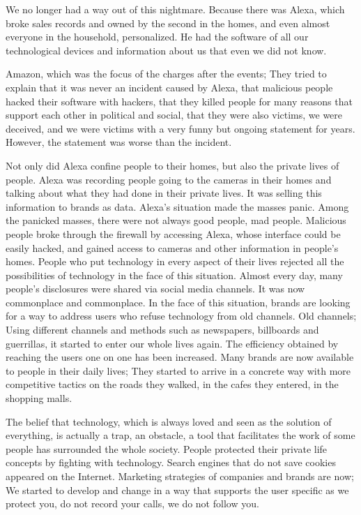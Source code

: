 \documentclass[]{book}
\begin{document}
We no longer had a way out of this nightmare. Because there was Alexa, which broke sales records and owned by the second in the homes, and even almost everyone in the household, personalized. He had the software of all our technological devices and information about us that even we did not know.

Amazon, which was the focus of the charges after the events; They tried to explain that it was never an incident caused by Alexa, that malicious people hacked their software with hackers, that they killed people for many reasons that support each other in political and social, that they were also victims, we were deceived, and we were victims with a very funny but ongoing statement for years. However, the statement was worse than the incident.

Not only did Alexa confine people to their homes, but also the private lives of people. Alexa was recording people going to the cameras in their homes and talking about what they had done in their private lives. It was selling this information to brands as data. Alexa's situation made the masses panic. Among the panicked masses, there were not always good people, mad people. Malicious people broke through the firewall by accessing Alexa, whose interface could be easily hacked, and gained access to cameras and other information in people's homes. People who put technology in every aspect of their lives rejected all the possibilities of technology in the face of this situation. Almost every day, many people's disclosures were shared via social media channels. It was now commonplace and commonplace. In the face of this situation, brands are looking for a way to address users who refuse technology from old channels. Old channels; Using different channels and methods such as newspapers, billboards and guerrillas, it started to enter our whole lives again. The efficiency obtained by reaching the users one on one has been increased. Many brands are now available to people in their daily lives; They started to arrive in a concrete way with more competitive tactics on the roads they walked, in the cafes they entered, in the shopping malls.

The belief that technology, which is always loved and seen as the solution of everything, is actually a trap, an obstacle, a tool that facilitates the work of some people has surrounded the whole society. People protected their private life concepts by fighting with technology. Search engines that do not save cookies appeared on the Internet. Marketing strategies of companies and brands are now; We started to develop and change in a way that supports the user specific as we protect you, do not record your calls, we do not follow you.
\end{document}
